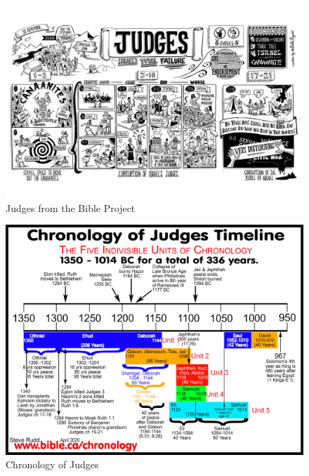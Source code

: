 \newpage
\begin{figure}
\begin{center}
\includegraphics[scale=0.5, angle=90]{07OT-Judges/References/2.BibleProject-Judges}
\caption[Judges from the Bible Project]{Judges from the Bible Project}
\label{fig:Judges from the Bible Project}
\end{center}
\end{figure}


\newpage
\begin{figure}
\begin{center}
\includegraphics[scale=0.6, angle=90]{07OT-Judges/References/3.Chronology-Judges}
\caption[Chronology of Judges]{Chronology of Judges}
\label{fig:Chronology of Judges}
\end{center}
\end{figure}


